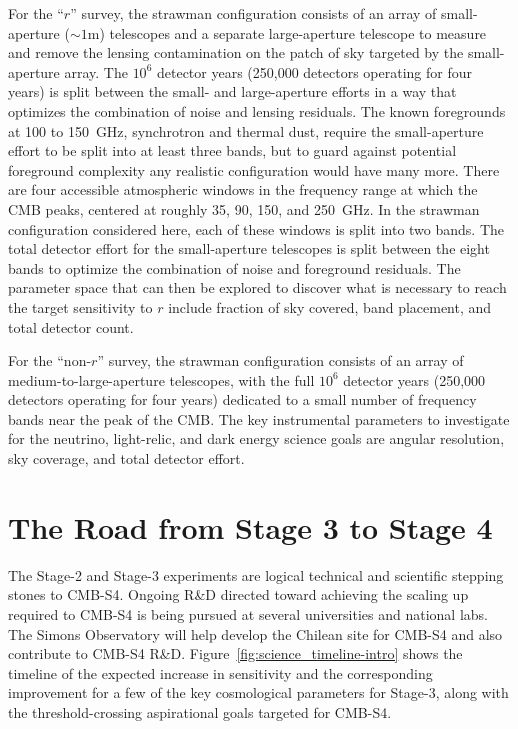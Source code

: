 For the ``$r$'' survey, the strawman configuration consists of an array of small-aperture ($\sim 1$m) telescopes and a separate large-aperture telescope to measure and remove the lensing contamination on the patch of sky targeted by the small-aperture array. The $10^6$ detector years (250,000 detectors operating for four years) is split between the small- and large-aperture efforts in a way that optimizes the combination of noise and lensing residuals. The known foregrounds at 100 to 150~GHz, synchrotron and thermal dust, require the small-aperture effort to be split into at least three bands, but to guard against potential foreground complexity any realistic configuration would have many more. There are four accessible atmospheric windows in the frequency range at which the CMB peaks, centered at roughly 35, 90, 150, and 250~GHz. In the strawman configuration considered here, each of these windows is split into two bands. The total detector effort for the small-aperture telescopes is split between the eight bands to optimize the combination of noise and foreground residuals. The parameter space that can then be explored to discover what is necessary to reach the target sensitivity to $r$ include fraction of sky covered, band placement, and total detector count.

For the ``non-$r$'' survey, the strawman configuration consists of an array of medium-to-large-aperture telescopes,  with the full $10^6$ detector years (250,000 detectors operating for four years) dedicated to a small number of frequency bands near the peak of the CMB. The key instrumental parameters to investigate for the neutrino, light-relic, and dark energy science goals are angular resolution, sky coverage, and total detector effort. 

\section{The Road from Stage 3 to Stage 4}
\label{sec:context}


The Stage-2 and Stage-3 experiments are logical technical and scientific stepping stones to CMB-S4. Ongoing R\&D directed toward achieving the scaling up required to CMB-S4 is being pursued at several universities and national labs. The Simons Observatory will help develop the Chilean site for CMB-S4 and also contribute to CMB-S4 R\&D. 
Figure~\ref{fig:science_timeline-intro} shows the timeline of the expected increase in sensitivity and the corresponding improvement for a few of the key cosmological parameters for Stage-3, along with the threshold-crossing aspirational goals  targeted for CMB-S4. 

